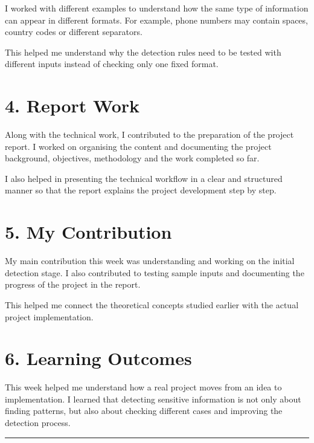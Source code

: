 \documentclass[11pt,a4paper]{article}
\begin{document}
I worked with different examples to understand how the same type of
information can appear in different formats. For example, phone numbers
may contain spaces, country codes or different separators.

This helped me understand why the detection rules need to be tested with
different inputs instead of checking only one fixed format.

\section*{4. Report Work}

Along with the technical work, I contributed to the preparation of the
project report. I worked on organising the content and documenting the
project background, objectives, methodology and the work completed so far.

I also helped in presenting the technical workflow in a clear and
structured manner so that the report explains the project development
step by step.

\section*{5. My Contribution}

My main contribution this week was understanding and working on the
initial detection stage. I also contributed to testing sample inputs and
documenting the progress of the project in the report.

This helped me connect the theoretical concepts studied earlier with the
actual project implementation.

\section*{6. Learning Outcomes}

This week helped me understand how a real project moves from an idea to
implementation. I learned that detecting sensitive information is not
only about finding patterns, but also about checking different cases and
improving the detection process.




\vfill

\begin{center}
    \textcolor{darkblue}{\rule{0.35\textwidth}{0.5pt}}\\[3pt]
   
\end{center}
\end{document}
